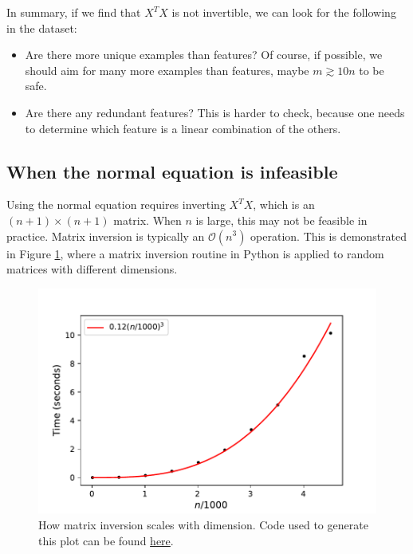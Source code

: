 \documentclass{article}
\theoremstyle{definition}
\begin{document}
In summary, if we find that $X^TX$ is not invertible, we can look for the following in the dataset:
\begin{itemize}
    \item Are there more unique examples than features? Of course, if possible, we should aim for many more examples than features, maybe $m\gtrsim 10n$ to be safe.
    \item Are there any redundant features? This is harder to check, because one needs to determine which feature is a linear combination of the others.
\end{itemize}

\subsection{When the normal equation is infeasible}
Using the normal equation requires inverting $X^TX$, which is an $(n+1)\times (n+1)$ matrix. When $n$ is large, this may not be feasible in practice. Matrix inversion is typically an $\mathcal{O}(n^3)$ operation. This is demonstrated in Figure  \ref{linreg-fig:inv-time}, where a matrix inversion routine in Python is applied to random matrices with different dimensions.

\begin{figure}[ht]
\centering
\includegraphics[scale=0.7]{images/lin_reg/inv_time.pdf}
\caption{How matrix inversion scales with dimension. Code used to generate this plot can be found \href{https://github.com/siavashaslanbeigi/ml_notes_supp/blob/master/lin_reg/inv_time.ipynb}{\color{blue} here}.}
\label{linreg-fig:inv-time}
\end{figure}
\end{document}
